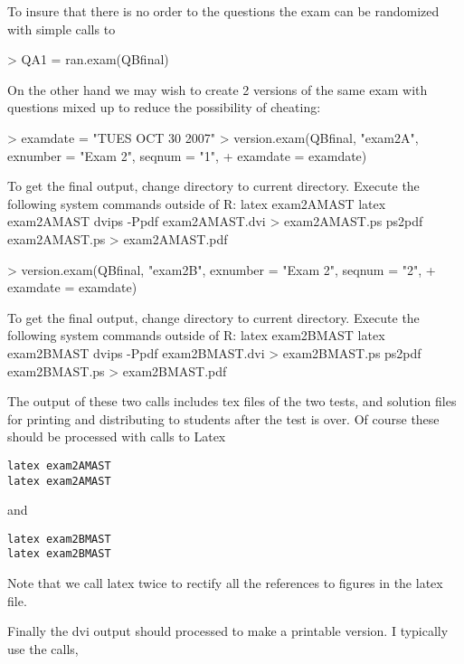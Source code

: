 \documentclass{article}
\begin{document}
To insure that there is no order to the questions
the exam can be randomized with simple calls to
\begin{Schunk}
\begin{Sinput}
> QA1 = ran.exam(QBfinal)
\end{Sinput}
\end{Schunk}

On the other hand we may wish to create 2 versions of the same exam with 
questions mixed up to reduce the possibility of cheating:

\begin{Schunk}
\begin{Sinput}
> examdate = "TUES OCT 30 2007"
> version.exam(QBfinal, "exam2A", exnumber = "Exam 2", seqnum = "1", 
+     examdate = examdate)
\end{Sinput}
\begin{Soutput}
To get the final output, change directory to current directory.
Execute the following system commands outside of R:
latex exam2AMAST
latex exam2AMAST
dvips -Ppdf exam2AMAST.dvi  > exam2AMAST.ps
ps2pdf exam2AMAST.ps   > exam2AMAST.pdf
\end{Soutput}
\begin{Sinput}
> version.exam(QBfinal, "exam2B", exnumber = "Exam 2", seqnum = "2", 
+     examdate = examdate)
\end{Sinput}
\begin{Soutput}
To get the final output, change directory to current directory.
Execute the following system commands outside of R:
latex exam2BMAST
latex exam2BMAST
dvips -Ppdf exam2BMAST.dvi  > exam2BMAST.ps
ps2pdf exam2BMAST.ps   > exam2BMAST.pdf
\end{Soutput}
\end{Schunk}



The output of these two calls includes tex files 
of the two tests, and solution files for printing and distributing
to students after the test is over.
Of course these should be processed 
with calls to Latex
\begin{verbatim}
latex exam2AMAST
latex exam2AMAST
\end{verbatim}
and
\begin{verbatim}
latex exam2BMAST
latex exam2BMAST
\end{verbatim}
Note that we call latex twice to rectify all the references
to figures in the latex file.

Finally the dvi output should processed 
to make a printable version.  I 
typically use the calls,
\end{document}
